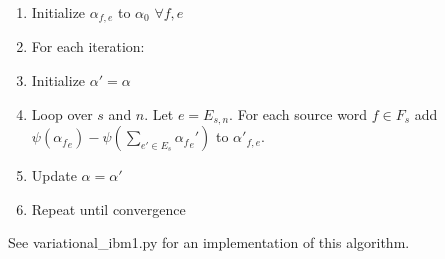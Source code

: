 \documentclass[11pt]{article}
\begin{document}
\begin{enumerate}
\item Initialize $\alpha_{f,e}$ to $\alpha_0$ $\forall f, e$
\item For each iteration:
\item Initialize $\alpha' = \alpha$
\item Loop over $s$ and $n$. Let $e = E_{s,n}$. For each source word $f \in F_s$ add $\psi({\alpha_f}_e) - \psi(\sum_{e' \in E_s} {\alpha_f}_e')$ to $\alpha'_{f,e}$.
\item Update $\alpha = \alpha'$
\item Repeat until convergence 
\end{enumerate}

See variational\_ibm1.py for an implementation of this algorithm.
\end{document}
